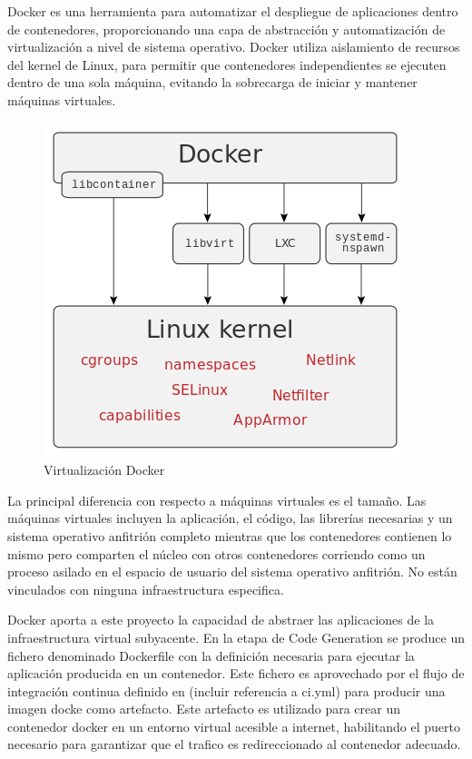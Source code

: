 \documentclass[a4paper,11pt]{book}
\begin{document}
Docker\cite{dk} es una herramienta para automatizar el despliegue de aplicaciones dentro de contenedores, proporcionando una capa de abstracción y automatización de virtualización a nivel de sistema operativo. Docker utiliza aislamiento de recursos del kernel de Linux, para permitir que contenedores independientes se ejecuten dentro de una sola máquina, evitando la sobrecarga de iniciar y mantener máquinas virtuales.

\begin{figure}[H]
\centering
\includegraphics[scale=0.35]{imagenes/docker.png}
\caption{ Virtualización Docker\cite{dkw}}
\end{figure}

La principal diferencia con respecto a máquinas virtuales es el tamaño. Las máquinas virtuales incluyen la aplicación, el código, las librerías necesarias y un sistema operativo anfitrión completo mientras que los contenedores contienen lo mismo pero comparten el núcleo con otros contenedores corriendo como un proceso asilado en el espacio de usuario del sistema operativo anfitrión. No están vinculados con ninguna infraestructura especifica.

Docker aporta a este proyecto la capacidad de abstraer las aplicaciones de la infraestructura virtual subyacente. En la etapa de Code Generation se produce un fichero denominado Dockerfile con la definición necesaria para ejecutar la aplicación producida en un contenedor. Este fichero es aprovechado  por el flujo de integración continua definido en (incluir referencia a ci.yml)  para producir una imagen docke como artefacto. Este artefacto es utilizado para crear un contenedor docker en un entorno virtual acesible a internet, habilitando el puerto necesario para garantizar que el trafico es redireccionado al contenedor adecuado.
\end{document}

